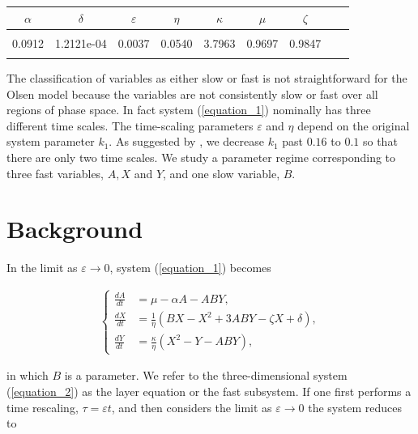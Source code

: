 \documentclass{ws-ijbc}
\begin{document}
\begin{table}[h]
{\begin{tabular}{c  c  c  c  c  c  c  c  c} \\[-2pt]
\toprule
$\alpha$ & $\delta$ & $\varepsilon$ & $\eta$ & $\kappa$ & $\mu$ & $\zeta$ \\[6pt]
\hline\\[-2pt]
0.0912 & 1.2121e-04 & 0.0037 & 0.0540 & 3.7963 & 0.9697 & 0.9847\\[1pt]
\botrule
\end{tabular}}
\end{table}

The classification of variables as either slow or fast is not straightforward for the Olsen model because the variables are not consistently slow or fast over all regions of phase space.  In fact system (\ref{equation_1}) nominally has three different time scales.  The time-scaling parameters $\varepsilon$ and $\eta$ depend on the original system parameter $k_1$.  As suggested by \cite{Rescaling}, we decrease $k_{1}$ past $0.16$ to $0.1$ so that there are only two time scales.  We study a parameter regime corresponding to three fast variables, $A, X$ and $Y$, and one slow variable, $B$.

\section{Background}
    
In the limit as $\varepsilon \rightarrow 0$, system (\ref{equation_1}) becomes
    
\begin{equation}
\begin{aligned}
\begin{cases}
\frac{dA}{dt} &= \mu - \alpha A - ABY, \\
\frac{dX}{dt} &= \frac{1}{\eta}(BX - X^2 +3ABY - \zeta X + \delta), \\
\frac{dY}{dt} &= \frac{\kappa}{\eta}(X^2 - Y - ABY),
\end{cases}
\end{aligned}
\label{equation_2}
\end{equation}
    
\noindent
in which $B$ is a parameter.  We refer to the three-dimensional system (\ref{equation_2}) as the layer equation or the fast subsystem.  If one first performs a time rescaling, $\tau = \varepsilon t$, and then considers the limit as $\varepsilon \rightarrow 0$ the system reduces to
    
\end{document}

